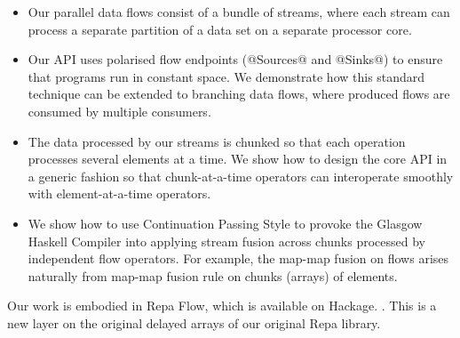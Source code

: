 \begin{itemize}
\item Our parallel data flows consist of a bundle of streams, where each stream can process a separate partition of a data set on a separate processor core.

\item Our API uses polarised flow endpoints (@Sources@ and @Sinks@) to ensure that programs run in constant space. We demonstrate how this standard technique can be extended to branching data flows, where produced flows are consumed by multiple consumers.

\item The data processed by our streams is chunked so that each operation processes several elements at a time. We show how to design the core API in a generic fashion so that chunk-at-a-time operators can interoperate smoothly with element-at-a-time operators.

\item We show how to use Continuation Passing Style to provoke the Glasgow Haskell Compiler into applying stream fusion across chunks processed by independent flow operators. For example, the map-map fusion on flows arises naturally from map-map fusion rule on chunks (arrays) of elements.
\end{itemize}

Our work is embodied in Repa Flow, which is available on Hackage. . This is a new layer on the original delayed arrays of our original Repa library.

